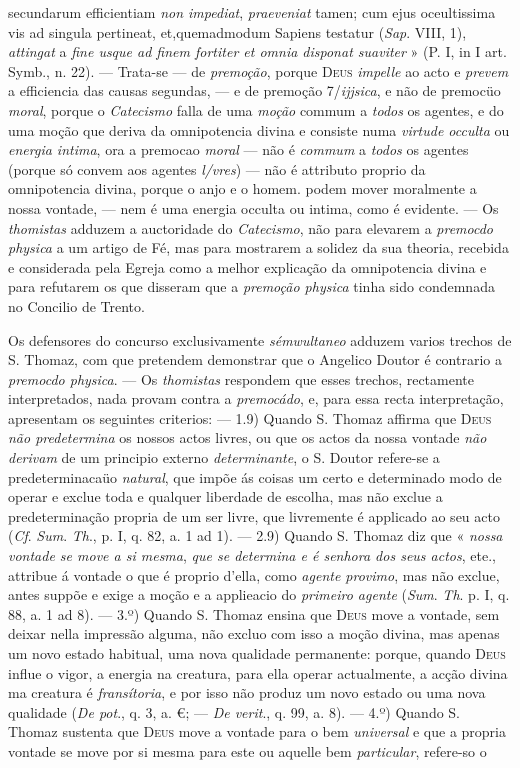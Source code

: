 secundarum efficientiam \emph{non impediat}, \emph{praeveniat} tamen; cum ejus oceultissima vis ad singula pertineat, et,quemadmodum Sapiens testatur (\emph{Sap}. VIII, 1), \emph{attingat} a \emph{fine usque ad finem fortiter et omnia disponat suaviter} » (P. I, in I art. Symb., n. 22). --- Trata-se --- de \emph{premoção}, porque \textsc{Deus} \emph{impelle} ao acto e \emph{prevem} a efficiencia das causas segundas, --- e de premoção 7/\emph{ijjsica}, e não de premocüo \emph{moral}, porque o \emph{Catecismo} falla de uma \emph{moção} commum a \emph{todos} os agentes, e do uma moção que deriva da omnipotencia divina e consiste numa \emph{virtude occulta} ou \emph{energia intima}, ora a premocao \emph{moral} --- não é \emph{commum} a \emph{todos} os agentes (porque só convem aos agentes \emph{l/vres}) --- não é attributo proprio da omnipotencia divina, porque o anjo e o homem. podem mover moralmente a nossa vontade, --- nem é uma energia occulta ou intima, como é evidente. --- Os \emph{thomistas} adduzem a auctoridade do \emph{Catecismo}, não para elevarem a \emph{premocdo physica} a um artigo de Fé, mas para mostrarem a solidez da sua theoria, recebida e considerada pela Egreja como a melhor explicação da omnipotencia divina e para refutarem os que disseram que a \emph{premoção physica} tinha sido condemnada no Concilio de Trento.\par Os defensores do concurso exclusivamente \emph{sémwultaneo} adduzem varios trechos de S. Thomaz, com que pretendem demonstrar que o Angelico Doutor é contrario a \emph{premocdo physica}. --- Os \emph{thomistas} respondem que esses trechos, rectamente interpretados, nada provam contra a \emph{premocádo}, e, para essa recta interpretação, apresentam os seguintes criterios: --- 1.9) Quando S. Thomaz affirma que \textsc{Deus} \emph{não predetermina} os nossos actos livres, ou que os actos da nossa vontade \emph{não derivam} de um principio externo \emph{determinante}, o S. Doutor refere-se a predeterminacaüo \emph{natural}, que impõe ás coisas um certo e determinado modo de operar e exclue toda e qualquer liberdade de escolha, mas não exclue a predeterminação propria de um ser livre, que livremente é applicado ao seu acto (\emph{Cf}. \emph{Sum}. \emph{Th}., p. I, q. 82, a. 1 ad 1). --- 2.9) Quando S. Thomaz diz que « \emph{nossa vontade se move a si mesma}, \emph{que se determina e é senhora dos seus actos}, ete., attribue á vontade o que é proprio d'ella, como \emph{agente provimo}, mas não exclue, antes suppõe e exige a moção e a applieacio do \emph{primeiro agente} (\emph{Sum}. \emph{Th}. p. I, q. 88, a. 1 ad 8). --- 3.º) Quando S. Thomaz ensina que \textsc{Deus} move a vontade, sem deixar nella impressão alguma, não excluo com isso a moção divina, mas apenas um novo estado habitual, uma nova qualidade permanente: porque, quando \textsc{Deus} influe o vigor, a energia na creatura, para ella operar actualmente, a acção divina ma creatura é \emph{fransítoria}, e por isso não produz um novo estado ou uma nova qualidade (\emph{De pot}., q. 3, a. €; --- \emph{De verit}., q. 99, a. 8). --- 4.º) Quando S. Thomaz sustenta que \textsc{Deus} move a vontade para o bem \emph{universal} e que a propria vontade se move por si mesma para este ou aquelle bem \emph{particular}, refere-so o 